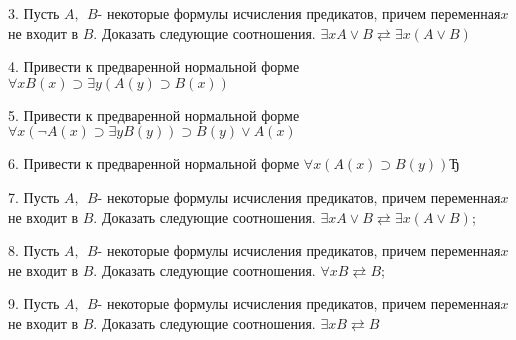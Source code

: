3. Пусть \(A,\ \ B\)- некоторые формулы исчисления предикатов, причем переменная\(x\) не входит в \(B\). Доказать следующие соотношения. \(\exists xA \vee B \rightleftarrows \exists x(A \vee B)\)

4. Привести к предваренной нормальной форме \(\forall xB(x) \supset \exists y(A(y) \supset B(x))\)

5. Привести к предваренной нормальной форме \(\forall x(\neg A(x) \supset \exists yB(y)) \supset B(y) \vee A(x)\)

6. Привести к предваренной нормальной форме \(\forall x(A(x) \supset B(y))Ђ\)

7. Пусть \(A,\ \ B\)- некоторые формулы исчисления предикатов, причем переменная\(x\) не входит в \(B\). Доказать следующие соотношения. \(\exists xA \vee B \rightleftarrows \exists x(A \vee B)\);

8. Пусть \(A,\ \ B\)- некоторые формулы исчисления предикатов, причем переменная\(x\) не входит в \(B\). Доказать следующие соотношения. \(\forall xB \rightleftarrows B\);

9. Пусть \(A,\ \ B\)- некоторые формулы исчисления предикатов, причем переменная\(x\) не входит в \(B\). Доказать следующие соотношения. \(\exists xB \rightleftarrows B\)
